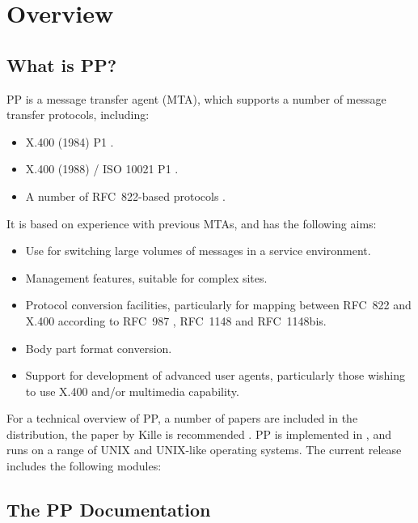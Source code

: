 
\chapter {Overview}

\section {What is PP?}

PP is a message transfer agent (MTA), which supports a number of
message transfer protocols, including:

\begin {itemize}
\item X.400 (1984) P1 \cite{MHS}.
\item X.400 (1988) / ISO 10021 P1 \cite{CCITT.MHS}.
\item A number of RFC~822-based protocols \cite{RFC822}.
\end {itemize}

It is based on experience with previous MTAs, and has the following
aims:

\begin {itemize}
\item  Use for switching large volumes of messages in a service environment.
\item  Management features, suitable for complex sites.
\item Protocol conversion facilities, particularly for mapping between
RFC~822 and X.400 according to RFC~987 \cite{ARPA.MHS},
RFC~1148\cite{RFC1148} and RFC~1148bis.
\item  Body part format conversion.
\item Support for development of advanced user agents, particularly those
wishing to use X.400 and/or multimedia capability.
\end {itemize}

For a technical overview of PP, a number of papers are included in the
distribution, the paper by Kille is recommended
\cite{IFIP.PP}.   PP is implemented in , and runs on a range of
UNIX and UNIX-like operating systems. 
The current release includes the following modules:





\section {The PP Documentation}


